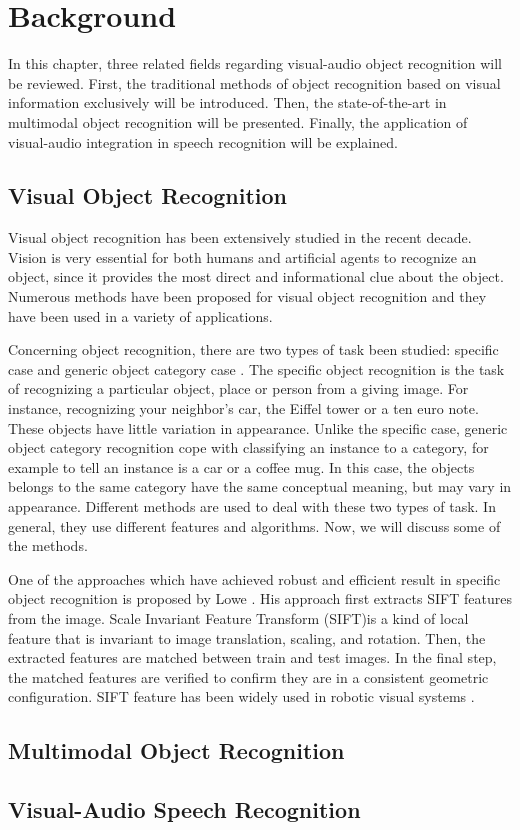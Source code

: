\chapter{Background}\label{background}

In this chapter, three related fields regarding visual-audio object recognition will be reviewed. First, the traditional methods of object recognition based on visual information exclusively will be introduced. Then, the state-of-the-art in multimodal object recognition will be presented. Finally, the application of visual-audio integration in speech recognition will be explained.

\section{Visual Object Recognition}
Visual object recognition has been extensively studied in the recent decade. Vision is very essential for both humans and artificial agents to recognize an object, since it provides the most direct and informational clue about the object. Numerous methods have been proposed for visual object recognition and they have been used in a variety of applications.

Concerning object recognition, there are two types of task been studied: specific case and generic object category case \cite{grauman_visual_2011}. The specific object recognition is the task of recognizing a particular object, place or person from a giving image. For instance, recognizing your neighbor's car, the Eiffel tower or a ten euro note. These objects have little variation in appearance. Unlike the specific case, generic object category recognition cope with classifying an instance to a category, for example to tell an instance is a car or a coffee mug. In this case, the objects belongs to the same category have the same conceptual meaning, but may vary in appearance.  Different methods are used to deal with these two types of task. In general, they use different features and algorithms. Now, we will discuss some of the methods.

One of the approaches which have achieved robust and efficient result in specific object recognition is proposed by Lowe \cite{lowe_object_1999}. His approach first extracts SIFT features from the image. Scale Invariant Feature Transform (SIFT)is a kind of local feature that is invariant to image translation, scaling, and rotation. Then, the extracted features are matched between train and test images. In the final step, the matched features are verified to confirm they are in a consistent geometric configuration. SIFT feature has been widely used in robotic visual systems \cite{grauman_visual_2011}.


\section{Multimodal Object Recognition}

\section{Visual-Audio Speech Recognition}

